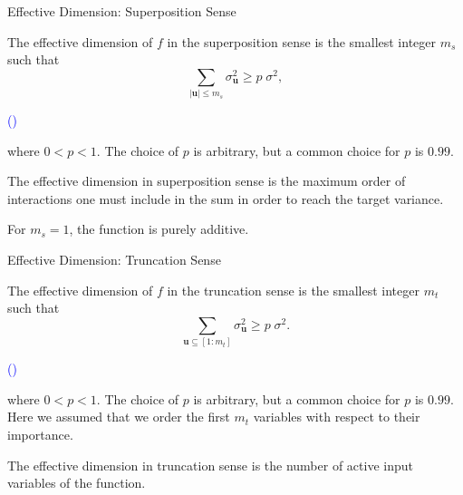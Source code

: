 \documentclass[english,aspectratio=169]{beamer}
\renewcommand{\emph}[1]{\textcolor[HTML]{006d2c}{\fontseries{sb}\selectfont #1}}
\begin{document}
\begin{frame}[fragile]{Effective Dimension: Superposition Sense}
\small

The effective dimension of $f$ in the \emph{superposition sense}
is the smallest integer $m_s$ such that
\begin{equation*}
  \sum_{\lvert \bm{u} \rvert \leq m_s} \sigma_{\bm{u}}^2 \geq p \; \sigma^2,  
\end{equation*}
{\hfill \raggedright \tiny \textcolor{blue}{(\cite{Caflisch1997})}}

where $0 < p < 1$. The choice of $p$ is arbitrary,
but a common choice for $p$ is $0.99$.

\begin{exampleblock}{}
  \centering
  The effective dimension in superposition sense is the \emph{maximum order of interactions}
  one must include in the sum in order to reach the target variance.
\end{exampleblock}

\vspace{0.5em}

For $m_s = 1$, the function is purely \emph{additive}.

\end{frame}

\begin{frame}[fragile]{Effective Dimension: Truncation Sense}
\small

The effective dimension of $f$ in the \emph{truncation sense}
is the smallest integer $m_t$ such that
\begin{equation*}
  \sum_{\bm{u} \subseteq [1:m_t]} \sigma_{\bm{u}}^2 \geq p \; \sigma^2.  
\end{equation*}
{\hfill \raggedright \tiny \textcolor{blue}{(\cite{Caflisch1997})}}

where $0 < p < 1$. The choice of $p$ is arbitrary, but a common choice for $p$ is $0.99$.
Here we assumed that we order the first $m_t$ variables with respect to their importance.

\begin{exampleblock}{}
  \centering
  The effective dimension in truncation sense is the number of \emph{active input variables}
  of the function.
\end{exampleblock}

\end{frame}
\end{document}
